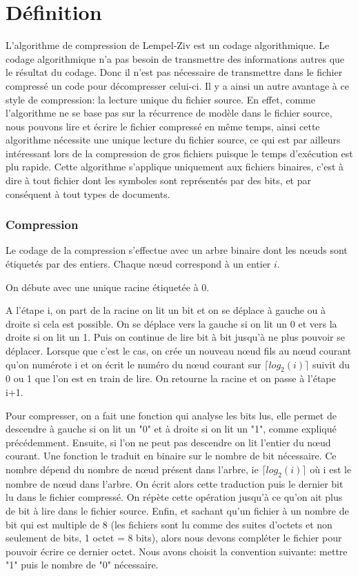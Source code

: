 \documentclass{report}
\begin{document}
\section*{Définition }

L'algorithme de compression de Lempel-Ziv est un codage algorithmique.  Le codage algorithmique n’a pas besoin de transmettre des informations autres que le résultat du codage. Donc il n'est pas nécessaire de transmettre dans le fichier compressé un code pour décompresser celui-ci. Il y a ainsi un autre avantage à ce style de compression: la lecture unique du fichier source. En effet, comme l'algorithme ne se base pas sur la récurrence de modèle dans le fichier source, nous pouvons lire et écrire le fichier compressé en même temps, ainsi cette algorithme nécessite une unique lecture du fichier source, ce qui est par ailleurs intéressant lors de la compression de gros fichiers puisque le temps d'exécution est plu rapide. 
Cette algorithme s'applique uniquement aux fichiers binaires, c'est à dire à tout fichier dont les symboles sont représentés par des bits, et par conséquent à tout types de documents. 

\subsubsection{Compression}
Le codage de la compression s'effectue avec un arbre binaire dont les nœuds sont étiquetés par des entiers. Chaque nœud correspond à un entier $i$. 

On débute avec une unique racine étiquetée à 0.

A l'étape i, on part de la racine on lit un bit et on se déplace à gauche ou à droite si cela est possible. On se déplace vers la gauche si on lit un 0 et vers la droite si on lit un 1. Puis on continue de lire bit à bit jusqu'à ne plus pouvoir se déplacer. Lorsque que c'est le cas, on crée un nouveau nœud fils au nœud courant qu'on numérote i et on écrit le numéro du nœud courant sur $\lceil log_{2}(i) \rceil$ suivit du 0 ou 1 que l'on est en train de lire.
On retourne la racine et on passe à l'étape i+1.

Pour compresser, on a fait une fonction qui analyse les bits lus, elle permet de descendre à gauche si on lit un "0" et à droite si on lit un "1", comme expliqué précédemment. Ensuite, si l'on ne peut pas descendre on lit l'entier du nœud courant. Une fonction le traduit en binaire sur le nombre de bit nécessaire. Ce nombre dépend du nombre de nœud présent dans l'arbre, ie $\lceil log_{2}(i) \rceil$ où i est le nombre de nœud dans l'arbre. 
On écrit alors cette traduction puis le dernier bit lu dans le fichier compressé. On répète cette opération jusqu'à ce qu'on ait plus de bit  à lire dans le fichier source.
Enfin, et sachant qu'un fichier à un nombre de bit qui est multiple de 8 (les fichiers sont lu comme des suites d'octets et non seulement de bits, 1 octet = 8 bits), alors nous devons compléter le fichier pour pouvoir écrire ce dernier octet.
Nous avons choisit la convention suivante: mettre "1" puis le nombre de "0" nécessaire. 
\end{document}
